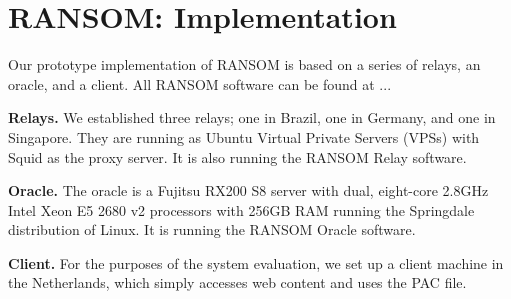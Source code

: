 \section{RANSOM: Implementation}
Our prototype implementation of RANSOM is based on a series of relays, an oracle, and 
a client. All RANSOM software can be found at ... 

{\bf Relays.}  We established three relays; one in Brazil, one in Germany, and 
one in Singapore.  They are running as Ubuntu Virtual Private Servers (VPSs) with 
Squid as the proxy server.  It is also running the RANSOM Relay software.

{\bf Oracle.}  The oracle is a Fujitsu RX200 S8 server with dual, 
eight-core 2.8GHz Intel Xeon E5 2680 v2 processors with 256GB RAM running the 
Springdale distribution of Linux. It is running the RANSOM Oracle software.

{\bf Client.} For the purposes of the system evaluation, we set up a client 
machine in the Netherlands, which simply accesses web content and uses the PAC 
file.
